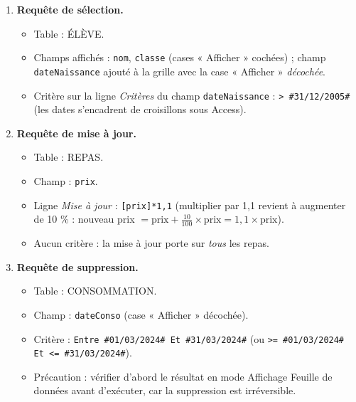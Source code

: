 \documentclass[11pt]{article}
\begin{document}
\begin{corrige}
\begin{enumerate}
  \item \textbf{Requête de sélection.}
  \begin{itemize}
    \item Table : ÉLÈVE.
    \item Champs affichés : \texttt{nom}, \texttt{classe} (cases « Afficher » cochées) ; champ \texttt{dateNaissance} ajouté à la grille avec la case « Afficher » \emph{décochée}.
    \item Critère sur la ligne \emph{Critères} du champ \texttt{dateNaissance} : \texttt{> \#31/12/2005\#} (les dates s'encadrent de croisillons sous Access).
  \end{itemize}
  \item \textbf{Requête de mise à jour.}
  \begin{itemize}
    \item Table : REPAS.
    \item Champ : \texttt{prix}.
    \item Ligne \emph{Mise à jour} : \texttt{[prix]*1,1} (multiplier par 1,1 revient à augmenter de 10 \% : nouveau prix $= \text{prix} + \frac{10}{100}\times\text{prix} = 1{,}1\times\text{prix}$).
    \item Aucun critère : la mise à jour porte sur \emph{tous} les repas.
  \end{itemize}
  \item \textbf{Requête de suppression.}
  \begin{itemize}
    \item Table : CONSOMMATION.
    \item Champ : \texttt{dateConso} (case « Afficher » décochée).
    \item Critère : \texttt{Entre \#01/03/2024\# Et \#31/03/2024\#} (ou \texttt{>= \#01/03/2024\# Et <= \#31/03/2024\#}).
    \item Précaution : vérifier d'abord le résultat en mode Affichage Feuille de données avant d'exécuter, car la suppression est irréversible.
  \end{itemize}
\end{enumerate}
\end{corrige}
\end{document}
